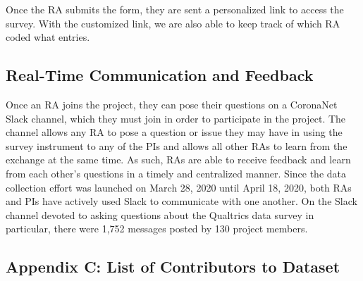 \documentclass[
]{article}
\begin{document}
Once the RA submits the form, they are sent a personalized link to access the survey. With the customized link, we are also able to keep track of which RA coded what entries.

\hypertarget{real-time-communication-and-feedback}{%
\subsection{Real-Time Communication and Feedback}\label{real-time-communication-and-feedback}}

Once an RA joins the project, they can pose their questions on a CoronaNet Slack channel, which they must join in order to participate in the project. The channel allows any RA to pose a question or issue they may have in using the survey instrument to any of the PIs and allows all other RAs to learn from the exchange at the same time. As such, RAs are able to receive feedback and learn from each other's questions in a timely and centralized manner. Since the data collection effort was launched on March 28, 2020 until April 18, 2020, both RAs and PIs have actively used Slack to communicate with one another. On the Slack channel devoted to asking questions about the Qualtrics data survey in particular, there were 1,752 messages posted by 130 project members.

\hypertarget{appendix-c-list-of-contributors-to-dataset}{%
\subsection*{Appendix C: List of Contributors to Dataset}\label{appendix-c-list-of-contributors-to-dataset}}
\end{document}
